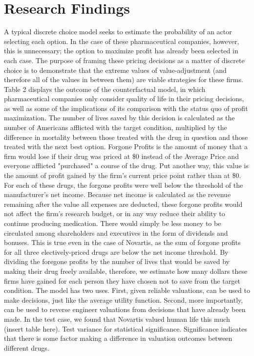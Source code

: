 \documentclass[12pt,english]{article} \usepackage{mathptmx}
\begin{document}
\section{Research Findings}\label{sec:results} A typical discrete choice 
model seeks to estimate the probability of an actor selecting each 
option. In the case of these pharmaceutical companies, however, this is 
unnecessary; the option to maximize profit has already been selected in 
each case. The purpose of framing these pricing decisions as a matter of 
discrete choice is to demonstrate that the extreme values of 
value-adjustment (and therefore all of the values in between them) are 
viable strategies for these firms. Table 2 displays the outcome of the 
counterfactual model, in which pharmaceutical companies only consider 
quality of life in their pricing decisions, as well as some of the 
implications of its comparison with the status quo of profit 
maximization. The number of lives saved by this decision is calculated 
as the number of Americans afflicted with the target condition, 
multiplied by the difference in mortality between those treated with the 
drug in question and those treated with the next best option. Forgone 
Profits is the amount of money that a firm would lose if their drug was 
priced at \$0 instead of the Average Price and everyone afflicted 
"purchased" a course of the drug. Put another way, this value is the 
amount of profit gained by the firm's current price point rather than at 
\$0. For each of these drugs, the forgone profits were well below the 
threshold of the manufacturer's net income. Because net income is 
calculated as the revenue remaining after the value all expenses are 
deducted, these forgone profits would not affect the firm's research 
budget, or in any way reduce their ability to continue producing 
medication. There would simply be less money to be circulated among 
shareholders and executives in the form of dividends and bonuses. This 
is true even in the case of Novartis, as the sum of forgone profits for 
all three electively-priced drugs are below the net income threshold. By 
dividing the foregone profits by the number of lives that would be saved 
by making their drug freely available, therefore, we estimate how many 
dollars these firms have gained for each person they have chosen not to 
save from the target condition. The model has two uses. First, given 
reliable valuations, can be used to make decisions, just like the 
average utility function. Second, more importantly, can be used to 
reverse engineer valuations from decisions that have already been made. 
In the test case, we found that Novartis valued human life this much 
(insert table here). Test variance for statistical significance. 
Significance indicates that there is some factor making a difference in 
valuation outcomes between different drugs. 
\end{document}
